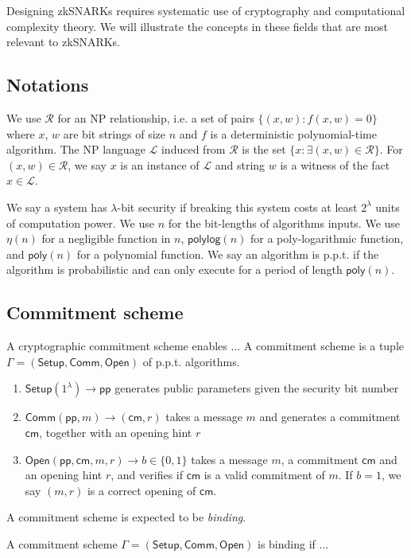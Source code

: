 \documentclass[acmtog]{acmart}
\newcommand{\cL}{\mathcal{L}}
\newcommand{\cR}{\mathcal{R}}
\newcommand{\Setup}{\mathsf{Setup}}
\newcommand{\Comm}{\mathsf{Comm}}
\newcommand{\Open}{\mathsf{Open}}
\newcommand{\pp}{\mathsf{pp}}
\newcommand{\cm}{\mathsf{cm}}
\newcommand{\polylog}{\mathsf{polylog}}
\newcommand{\poly}{\mathsf{poly}}
\begin{document}
Designing zkSNARKs requires systematic use of cryptography and computational complexity theory.
We will illustrate the concepts in these fields that are most relevant to zkSNARKs.

\subsection{Notations}

We use $\cR$ for an NP relationship, i.e. a set of pairs $\{(x,w):f(x,w)=0\}$ where $x$, $w$ are bit strings of size $n$ and $f$ is a deterministic polynomial-time algorithm.
The NP language $\cL$ induced from $\cR$ is the set $\{x:\exists (x,w)\in\cR\}$.
For $(x,w)\in\cR$, we say $x$ is an instance of $\cL$ and string $w$ is a witness of the fact $x\in\cL$.

We say a system has $\lambda$-bit security if breaking this system costs at least $2^{\lambda}$ units of computation power.
We use $n$ for the bit-lengths of algorithms inputs.
We use $\eta(n)$ for a negligible function in $n$, $\polylog(n)$ for a poly-logarithmic function, and $\poly(n)$ for a polynomial function.
We say an algorithm is p.p.t. if the algorithm is probabilistic and can only execute for a period of length $\poly(n)$.

\subsection{Commitment scheme}

A cryptographic commitment scheme enables ...
A commitment scheme is a tuple $\Gamma=(\Setup, \Comm, \Open)$ of p.p.t. algorithms.
\begin{enumerate}
	\item $\Setup(1^{\lambda})\to\pp$ generates public parameters given the security bit number
	\item $\Comm(\pp,m)\to(\cm,r)$ takes a message $m$ and generates a commitment $\cm$, together with an opening hint $r$
	\item $\Open(\pp,\cm,m,r)\to b\in\{0,1\}$ takes a message $m$, a commitment $\cm$ and an opening hint $r$, and verifies if $\cm$ is a valid commitment of $m$.
	If $b=1$, we say $(m,r)$ is a correct opening of $\cm$.
\end{enumerate}
A commitment scheme is expected to be \emph{binding}.

\begin{definition}[Binding]
A commitment scheme $\Gamma=(\Setup,\Comm,\Open)$ is binding if ...
\end{definition}
\end{document}
